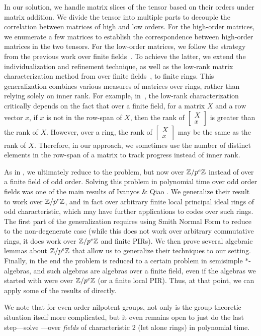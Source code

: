 In our solution, we handle matrix slices of the tensor based on their orders under matrix addition. 
We divide the tensor into multiple parts to decouple the correlation between matrices of high and low orders. 
For the high-order matrices, we enumerate a few matrices to establish the correspondence between high-order matrices in the two tensors. 
For the low-order matrices, we follow the strategy from the previous work over finite fields~\cite{Sun23,IMQSZ24}.
To achieve the latter, we extend the individualization and refinement technique, as well as the low-rank matrix characterization method from over finite fields~\cite{Sun23,IMQSZ24}, to finite rings. This generalization combines various measures of matrices over rings, rather than relying solely on inner rank. For example, in~\cite{Sun23}, the low-rank characterization critically depends on the fact that over a finite field, for a matrix $X$ and a row vector $x$, if $x$ is not in the row-span of $X$, then the rank of $\begin{bmatrix} X \\ x \end{bmatrix}$ is greater than the rank of $X$. However, over a ring, the rank of $\begin{bmatrix} X \\ x \end{bmatrix}$ may be the same as the rank of $X$. Therefore, in our approach, we sometimes use the number of distinct elements in the row-span of a matrix to track progress instead of inner rank.

As in \cite{Sun23, IMQSZ24}, we ultimately reduce to the  problem, but now over $\mathbb{Z}/p^e \mathbb{Z}$ instead of over a finite field of odd order. Solving this problem in polynomial time over odd order fields was one of the main results of Ivanyos \& Qiao \cite{IQ19}. We generalize their result to work over $\mathbb{Z}/p^e \mathbb{Z}$, and in fact over arbitrary finite local principal ideal rings of odd characteristic, which may have further applications to codes over such rings. The first part of the generalization requires using Smith Normal Form to reduce to the non-degenerate case (while this does not work over arbitrary commutative rings, it does work over $\mathbb{Z}/p^e \mathbb{Z}$ and finite PIRs). We then prove several algebraic lemmas about $\mathbb{Z}/p^e \mathbb{Z}$ that allow us to generalize their techniques to our setting. Finally, in the end the problem is reduced to a certain problem in semisimple $*$-algebras, and such algebras are algebras over a finite field, even if the algebras we started with were over $\mathbb{Z}/p^e \mathbb{Z}$ (or a finite local PIR). Thus, at that point, we can apply some of the results of \cite{IQ19} directly.

We note that for even-order nilpotent groups, not only is the group-theoretic situation itself more complicated, but it even remains open to just do the last step---solve ---over \emph{fields} of characteristic 2 (let alone rings) in polynomial time.
